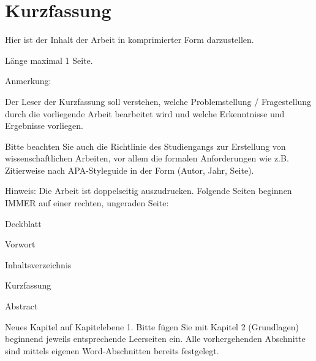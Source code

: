 \chapter{Kurzfassung}
Hier ist der Inhalt der Arbeit in komprimierter Form darzustellen.  

Länge maximal 1 Seite. 

Anmerkung:  

Der Leser der Kurzfassung soll verstehen, welche Problemstellung / Fragestellung durch die vorliegende Arbeit bearbeitet wird und welche Erkenntnisse und Ergebnisse vorliegen. 

Bitte beachten Sie auch die Richtlinie des Studiengangs zur Erstellung von wissenschaftlichen Arbeiten, vor allem die formalen Anforderungen wie z.B. Zitierweise nach APA-Styleguide in der Form (Autor, Jahr, Seite).  

Hinweis: Die Arbeit ist doppelseitig auszudrucken. Folgende Seiten beginnen IMMER auf einer rechten, ungeraden Seite: 

Deckblatt 

Vorwort 

Inhaltsverzeichnis 

Kurzfassung 

Abstract 

Neues Kapitel auf Kapitelebene 1. Bitte fügen Sie mit Kapitel 2 (Grundlagen) beginnend jeweils entsprechende Leerseiten ein. Alle vorhergehenden Abschnitte sind mittels eigenen Word-Abschnitten bereits festgelegt. 

\lipsum[2-3]